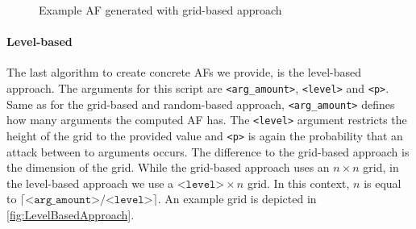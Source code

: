 \begin{figure}[h]
\begin{subfigure}[t]{0.3\textwidth}
    \label{af:ImplementationGridBasedExampleAFsc}
\end{subfigure}
\caption{Example AF generated with grid-based approach}
\label{fig:ImplementationGridBasedExampleAFs}
\end{figure}
\vspace{0.3cm}



\paragraph{Level-based} The last algorithm to create concrete AFs we provide, is the level-based approach. The arguments for this script are \texttt{<arg\_amount>}, \texttt{<level>} and \texttt{<p>}. Same as for the grid-based and random-based approach, \texttt{<arg\_amount>} defines how many arguments the computed AF has. The \texttt{<level>} argument restricts the height of the grid to the provided value and \texttt{<p>} is again the probability that an attack between to arguments occurs. The difference to the grid-based approach is the dimension of the grid. While the grid-based approach uses an $n \times n$ grid, in the level-based approach we use a $\texttt{<level>} \times n$ grid. In this context, $n$ is equal to $\lceil \texttt{<arg\_amount>}/\texttt{<level>} \rceil$. An example grid is depicted in \cref{fig:LevelBasedApproach}.


